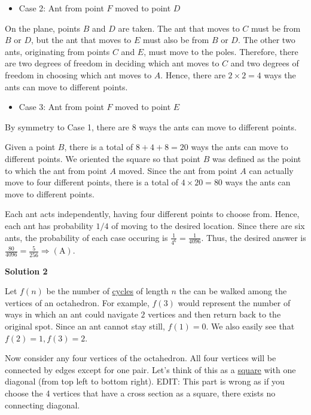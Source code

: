 \begin{enumerate}
 
            \begin{itemize}
        \item Case 2: Ant from point $F$ moved to point $D$
            \end{itemize}
            On the plane, points $B$ and $D$ are taken. The ant that moves to $C$ must be from $B$ or $D$, but the ant that moves to $E$ must also be from $B$ or $D$. The other two ants, originating from points $C$ and $E$, must move to the poles. Therefore, there are two degrees of freedom in deciding which ant moves to $C$ and two degrees of freedom in choosing which ant moves to $A$. Hence, there are $2 \times 2=4$ ways the ants can move to different points.

 
            \begin{itemize}
        \item Case 3: Ant from point $F$ moved to point $E$
            \end{itemize}
            By symmetry to Case 1, there are $8$ ways the ants can move to different points.

 Given a point $B$, there is a total of $8+4+8=20$ ways the ants can move to different points. We oriented the square so that point $B$ was defined as the point to which the ant from point $A$ moved. Since the ant from point $A$ can actually move to four different points, there is a total of $4 \times 20=80$ ways the ants can move to different points.

 Each ant acts independently, having four different points to choose from. Hence, each ant has probability $1/4$ of moving to the desired location. Since there are six ants, the probability of each case occuring is $\frac{1}{4^6} = \frac{1}{4096}$. Thus, the desired answer is $\frac{80}{4096}= \boxed{\frac{5}{256}} \Rightarrow \mathrm{(A)}$.

 



\textbf{Solution 2}

Let $f(n)$ be the number of \href{https://artofproblemsolving.com/wiki/index.php?title=Cycle}{cycles} of length $n$ the can be walked among the vertices of an octahedron. For example, $f(3)$ would represent the number of ways in which an ant could navigate $2$ vertices and then return back to the original spot. Since an ant cannot stay still, $f(1) = 0$. We also easily see that $f(2) = 1, f(3) = 2$. 

 Now consider any four vertices of the octahedron. All four vertices will be connected by edges except for one pair. Let’s think of this as a \href{https://artofproblemsolving.com/wiki/index.php?title=Square}{square} with one diagonal (from top left to bottom right). EDIT: This part is wrong as if you choose the 4 vertices that have a cross section as a square, there exists no connecting diagonal.  


\end{enumerate}
